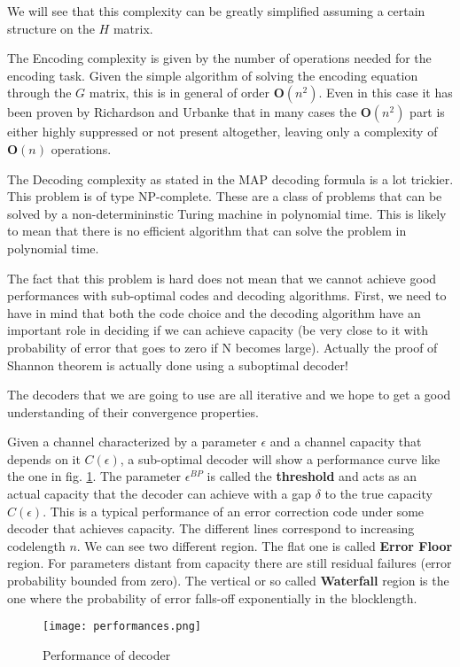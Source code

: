 We will see that this complexity can be greatly simplified assuming a certain structure on the $H$ matrix.

The Encoding complexity is given by the number of operations needed for the encoding task. Given the simple algorithm of solving the encoding equation through the $G$ matrix, this is in general of order $\mathbf{O}(n^2)$. Even in this case it has been proven by Richardson and Urbanke that in many cases the $\mathbf{O}(n^2)$ part is  either highly suppressed or not present altogether, leaving only a complexity of $\mathbf{O}(n)$ operations.

The Decoding complexity as stated in the MAP decoding formula is a lot trickier. This problem is of type NP-complete. These are a class of problems that can be solved by a non-determininstic Turing machine in polynomial time. This is likely to mean that there is no efficient algorithm that can solve the problem in polynomial time.

The fact that this problem is hard does not mean that we cannot achieve good performances with sub-optimal codes and decoding algorithms. First, we need to have in mind that both the code choice and the decoding algorithm have an important role in deciding if we can achieve capacity (be very close to it with probability of error that goes to zero if N becomes large). Actually the proof of Shannon theorem is actually done using a suboptimal decoder!

The decoders that we are going to use are all iterative and we hope to get a good understanding of their convergence properties.

Given a channel characterized by a parameter $\epsilon$ and a channel capacity that depends on it $C(\epsilon)$, a sub-optimal decoder will show a performance curve like the one in fig. \ref{fig:decoder_perf}. The parameter $\epsilon^{BP}$ is called the \textbf{threshold} and acts as an actual capacity that the decoder can achieve with a gap $\delta$ to the true capacity $C(\epsilon)$. This is a typical performance of an error correction code under some decoder that achieves capacity. The different lines correspond to increasing codelength $n$. We can see two different region. The flat one is called \textbf{Error Floor} region. For parameters distant from capacity there are still residual failures (error probability bounded from zero). The vertical or so called \textbf{Waterfall} region is the one where the probability of error falls-off exponentially in the blocklength. 

\begin{figure}
	\begin{center}
		\texttt{[image: performances.png]} \label{fig:decoder_perf}
		\caption{Performance of decoder}
	\end{center}
\end{figure}
